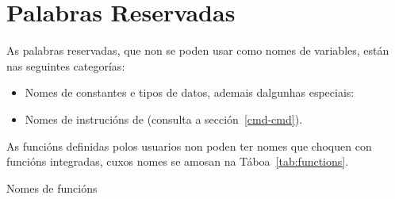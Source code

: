 \chapter{Palabras Reservadas}
\label{reswords}

As palabras reservadas, que non se poden usar como nomes de variables,
están nas seguintes categorías:

\begin{itemize}
\item Nomes de constantes e tipos de datos, ademais dalgunhas especiais:
  
  
\item Nomes de instrucións de  (consulta a sección~\ref{cmd-cmd}).
\end{itemize}

As funcións definidas polos usuarios non poden ter nomes que choquen con
funcións integradas, cuxos nomes se amosan na Táboa~\ref{tab:functions}.

\begin{table}[htbp]
\caption{Nomes de funcións}
\label{tab:functions}
\begin{center}

\end{center}
\end{table}
